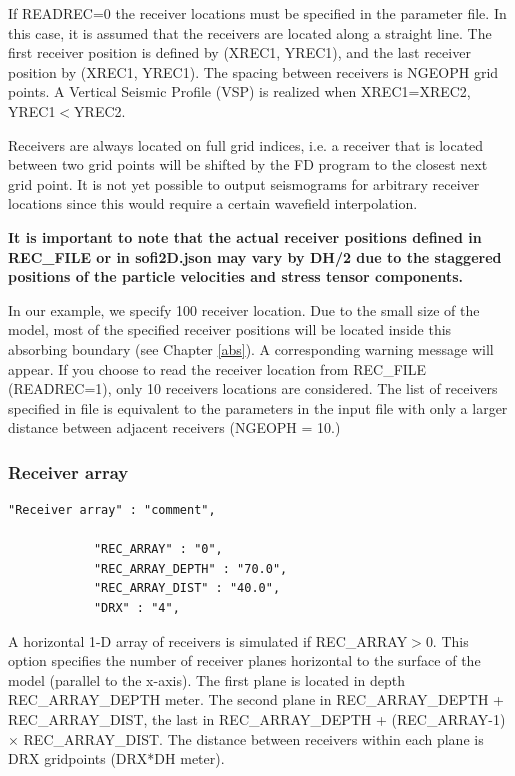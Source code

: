 \documentclass[11pt,onecolumn,oneside]{article}
\begin{document}
If READREC=0 the receiver locations must be specified in the parameter file. In this case, it is assumed that the receivers are located along a straight line. The first receiver position is defined by (XREC1, YREC1), and the last receiver position by (XREC1, YREC1). The spacing between receivers is NGEOPH grid points.  A Vertical Seismic Profile (VSP) is realized when XREC1=XREC2, YREC1$<$YREC2.  

Receivers are always located on full grid indices, i.e. a receiver that is located between two grid points will be shifted by the FD program to the closest next grid point. It is not yet possible
to output seismograms for arbitrary receiver locations since this would require a certain wavefield interpolation.

\textbf{It is important to note that the actual receiver positions defined in REC\_FILE or in sofi2D.json may vary by DH/2 due to the staggered positions of the particle velocities and stress tensor components. }

In our example, we specify 100 receiver location. Due to the small size of the model, most of the specified receiver positions will be located inside this absorbing boundary (see Chapter \ref{abs}). A corresponding warning message will appear. If you choose to read the receiver location from REC\_FILE  (READREC=1), only 10 receivers locations are considered. The list of receivers specified in file  is equivalent to the parameters in the input file with only a larger distance between adjacent receivers (NGEOPH = 10.)

\subsubsection{Receiver array}
\begin{verbatim}
"Receiver array" : "comment",

			"REC_ARRAY" : "0",
			"REC_ARRAY_DEPTH" : "70.0",
			"REC_ARRAY_DIST" : "40.0", 
			"DRX" : "4",

\end{verbatim}

A horizontal 1-D array of receivers is simulated if REC\_ARRAY$>$0. This option specifies the number of receiver planes horizontal to the surface of the model (parallel to the x-axis). The first plane is located in depth REC\_ARRAY\_DEPTH meter. The second plane in REC\_ARRAY\_DEPTH + REC\_ARRAY\_DIST, the last in REC\_ARRAY\_DEPTH + (REC\_ARRAY-1) $\times$ REC\_ARRAY\_DIST. The distance between receivers within each plane is DRX gridpoints (DRX*DH meter).
\end{document}
